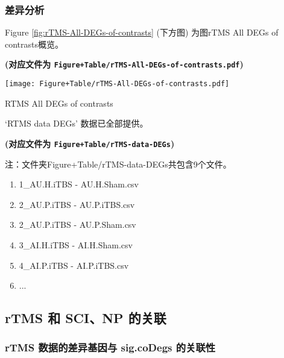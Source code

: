 \documentclass[
]{article}
\providecommand{\tightlist}{%
  \setlength{\itemsep}{0pt}\setlength{\parskip}{0pt}}
\begin{document}
\hypertarget{ux5deeux5f02ux5206ux6790-2}{%
\subsubsection{差异分析}\label{ux5deeux5f02ux5206ux6790-2}}

Figure \ref{fig:rTMS-All-DEGs-of-contrasts} (下方图) 为图rTMS All DEGs of contrasts概览。

\textbf{(对应文件为 \texttt{Figure+Table/rTMS-All-DEGs-of-contrasts.pdf})}

\def\@captype{figure}
\begin{center}
\texttt{[image: Figure+Table/rTMS-All-DEGs-of-contrasts.pdf]}
\caption{RTMS All DEGs of contrasts}\label{fig:rTMS-All-DEGs-of-contrasts}
\end{center}

`RTMS data DEGs' 数据已全部提供。

\textbf{(对应文件为 \texttt{Figure+Table/rTMS-data-DEGs})}

\begin{center}\begin{tcolorbox}[colback=gray!10, colframe=gray!50, width=0.9\linewidth, arc=1mm, boxrule=0.5pt]注：文件夹Figure+Table/rTMS-data-DEGs共包含9个文件。

\begin{enumerate}\tightlist
\item 1\_AU.H.iTBS - AU.H.Sham.csv
\item 2\_AU.P.iTBS - AU.P.iTBS.csv
\item 2\_AU.P.iTBS - AU.P.Sham.csv
\item 3\_AI.H.iTBS - AI.H.Sham.csv
\item 4\_AI.P.iTBS - AI.P.iTBS.csv
\item ...
\end{enumerate}\end{tcolorbox}
\end{center}

\hypertarget{rtms-ux548c-scinp-ux7684ux5173ux8054-1}{%
\subsection{rTMS 和 SCI、NP 的关联}\label{rtms-ux548c-scinp-ux7684ux5173ux8054-1}}

\hypertarget{mapping}{%
\subsubsection{rTMS 数据的差异基因与 sig.coDegs 的关联性}\label{mapping}}
\end{document}
